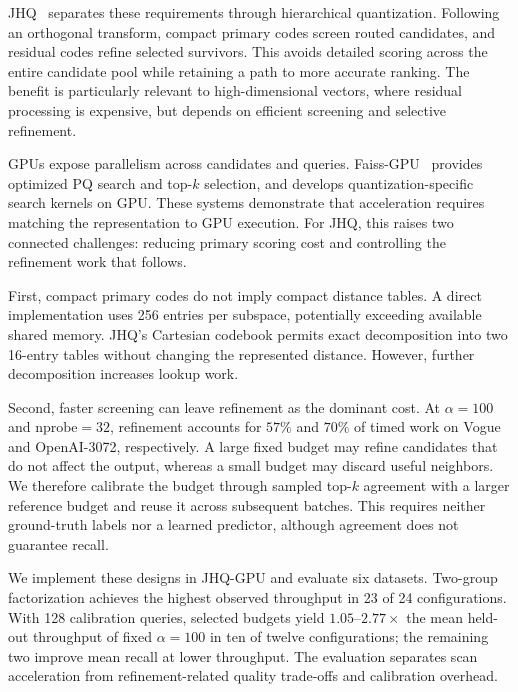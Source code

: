 JHQ~\cite{jhq} separates these requirements through hierarchical quantization. Following an orthogonal transform, compact primary codes screen routed candidates, and residual codes refine selected survivors. This avoids detailed scoring across the entire candidate pool while retaining a path to more accurate ranking. The benefit is particularly relevant to high-dimensional vectors, where residual processing is expensive, but depends on efficient screening and selective refinement.

GPUs expose parallelism across candidates and queries. Faiss-GPU~\cite{faissgpu} provides optimized PQ search and top-$k$ selection, and develops quantization-specific search kernels on GPU. These systems demonstrate that acceleration requires matching the representation to GPU execution. For JHQ, this raises two connected challenges: reducing primary scoring cost and controlling the refinement work that follows.

First, compact primary codes do not imply compact distance tables. A direct implementation uses 256 entries per subspace, potentially exceeding available shared memory. JHQ's Cartesian codebook permits exact decomposition into two 16-entry tables without changing the represented distance. However, further decomposition increases lookup work.

Second, faster screening can leave refinement as the dominant cost. At $\alpha=100$ and $\mathrm{nprobe}=32$, refinement accounts for $57\%$ and $70\%$ of timed work on Vogue and OpenAI-3072, respectively. A large fixed budget may refine candidates that do not affect the output, whereas a small budget may discard useful neighbors. We therefore calibrate the budget through sampled top-$k$ agreement with a larger reference budget and reuse it across subsequent batches. This requires neither ground-truth labels nor a learned predictor, although agreement does not guarantee recall.

We implement these designs in JHQ-GPU and evaluate six datasets. Two-group factorization achieves the highest observed throughput in 23 of 24 configurations. With 128 calibration queries, selected budgets yield $1.05$--$2.77\times$ the mean held-out throughput of fixed $\alpha=100$ in ten of twelve configurations; the remaining two improve mean recall at lower throughput. The evaluation separates scan acceleration from refinement-related quality trade-offs and calibration overhead.

